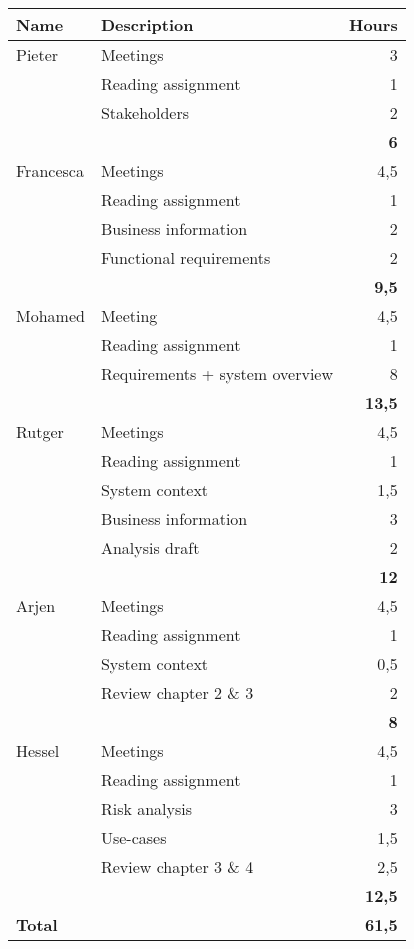 
\begin{longtable}{l p{} r}
     \toprule
     \bf Name & \bf Description & \bf Hours \\
     \toprule
     \endhead
     Pieter    & Meetings & 3 \\
               & Reading assignment & 1 \\
               & Stakeholders & 2 \\
               & & \bf 6 \\
     \midrule
     Francesca & Meetings & 4,5 \\
               & Reading assignment & 1 \\
               & Business information & 2 \\
               & Functional requirements & 2 \\
               & & \bf 9,5 \\
     \midrule
     Mohamed   & Meeting & 4,5 \\
               & Reading assignment & 1 \\
               & Requirements + system overview & 8 \\
               & & \bf 13,5 \\
     \midrule
     Rutger    & Meetings & 4,5 \\
               & Reading assignment & 1 \\
               & System context & 1,5 \\
               & Business information & 3 \\
               & Analysis draft & 2 \\
               & & \bf 12 \\
     \midrule
     Arjen     & Meetings & 4,5 \\
               & Reading assignment & 1 \\
               & System context & 0,5 \\
               & Review chapter 2 \& 3 & 2 \\
               & & \bf 8 \\
     \midrule
     Hessel    & Meetings & 4,5 \\
               & Reading assignment & 1 \\
               & Risk analysis & 3 \\
               & Use-cases & 1,5 \\
               & Review chapter 3 \& 4 & 2,5 \\
               & & \bf 12,5 \\
     \toprule
     \bf Total & & \bf 61,5 \\
\end{longtable}
